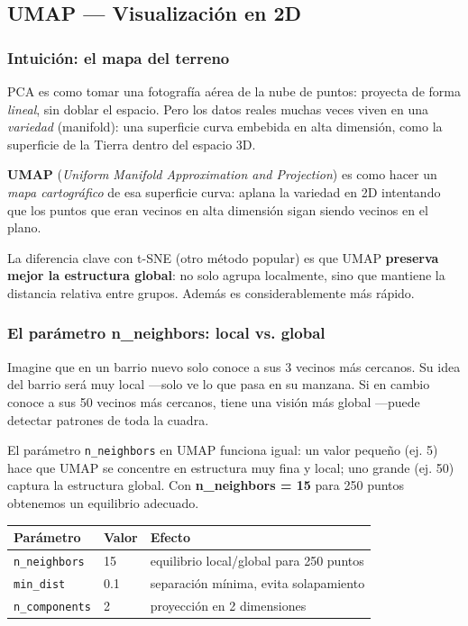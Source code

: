 \documentclass[12pt,a4paper]{article}
\begin{document}
\subsection{UMAP --- Visualización en 2D}

\subsubsection{Intuición: el mapa del terreno}

PCA es como tomar una fotografía aérea de la nube de puntos: proyecta de
forma \emph{lineal}, sin doblar el espacio.
Pero los datos reales muchas veces viven en una \emph{variedad} (manifold):
una superficie curva embebida en alta dimensión, como la superficie de la
Tierra dentro del espacio 3D.

\textbf{UMAP} (\textit{Uniform Manifold Approximation and Projection})
es como hacer un \emph{mapa cartográfico} de esa superficie curva:
aplana la variedad en 2D intentando que los puntos que eran vecinos en alta
dimensión sigan siendo vecinos en el plano.

La diferencia clave con t-SNE (otro método popular) es que UMAP
\textbf{preserva mejor la estructura global}: no solo agrupa localmente, sino
que mantiene la distancia relativa entre grupos.
Además es considerablemente más rápido.

\subsubsection{El parámetro n\_neighbors: local vs. global}

Imagine que en un barrio nuevo solo conoce a sus 3 vecinos más cercanos.
Su idea del barrio será muy local —solo ve lo que pasa en su manzana.
Si en cambio conoce a sus 50 vecinos más cercanos, tiene una visión más global
—puede detectar patrones de toda la cuadra.

El parámetro \texttt{n\_neighbors} en UMAP funciona igual: un valor pequeño
(ej. 5) hace que UMAP se concentre en estructura muy fina y local; uno grande
(ej. 50) captura la estructura global.
Con \textbf{n\_neighbors = 15} para 250 puntos obtenemos un equilibrio adecuado.

\begin{center}
\begin{tabular}{lll}
  \toprule
  Parámetro & Valor & Efecto \\
  \midrule
  \texttt{n\_neighbors} & 15 & equilibrio local/global para 250 puntos \\
  \texttt{min\_dist} & 0.1 & separación mínima, evita solapamiento \\
  \texttt{n\_components} & 2 & proyección en 2 dimensiones \\
  \bottomrule
\end{tabular}
\end{center}
\end{document}

